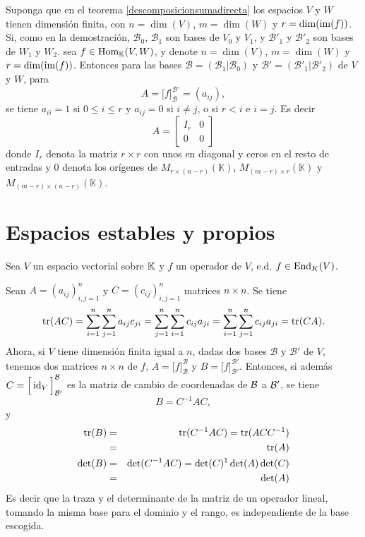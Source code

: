 \begin{obs}
Suponga que en el teorema \ref{descomposicionsumadirecta} los espacios $V$ y $W$ tienen dimensi\'on finita, con $n=\dim(V)$, $m=\dim(W)$ y $r=\dim(\operatorname{im}(f))$. Si, como en la demostración, $\mathcal{B}_0$, $\mathcal{B}_1$ son bases de $V_0$ y $V_1$, y $\mathcal{B}'_1$ y $\mathcal{B}'_2$ son bases de $W_1$ y $W_2$. sea $f\in\operatorname{Hom}_\mathbb{K}(V,W)$, y denote $n=\dim(V)$, $m=\dim(W)$ y $r=\dim(\operatorname{im}(f))$. Entonces para las bases $\mathcal{B}=\left(\mathcal{B}_1|\mathcal{B}_0\right)$ y $\mathcal{B}'=\left(\mathcal{B}'_1|\mathcal{B}'_2\right)$ de $V$ y $W$, para
\[
A=\Big[f\Big]^{\mathcal{B}'}_{\mathcal{B}}=(a_{ij}),
\]
se tiene $a_{ii}=1$ si $0\le i\le r$ y $a_{ij}=0$ si $i\ne j$, o si $r<i$ e $i=j$. Es decir
\[
A=\left[\begin{array}{c|c}
I_r & 0\\
\hline
0   & 0
\end{array}\right]
\]
donde $I_r$ denota la matriz $r\times r$ con unos en diagonal y ceros en el resto de entradas y $0$ denota los or\'igenes de $M_{r\times (n-r)}(\mathbb{K})$, $M_{(m-r)\times r}(\mathbb{K})$ y $M_{(m-r)\times(n-r)}(\mathbb{K})$.
\end{obs}

\section{Espacios estables y propios}

Sea $V$ un espacio vectorial sobre $\mathbb{K}$ y $f$ un operador de $V$, e.d. $f\in\operatorname{End}_K(V)$.

\begin{obs}
Sean $A=(a_{ij})_{i,j=1}^n$ y $C=(c_{ij})_{i,j=1}^n$ matrices $n\times n$. Se tiene
\[
  \operatorname{tr}(AC)=\sum_{i=1}^n\sum_{j=1}^na_{ij}c_{ji}=\sum_{j=1}^n\sum_{i=1}^nc_{ij}a_{ji}=\sum_{i=1}^n\sum_{j=1}^nc_{ij}a_{ji}=\operatorname{tr}(CA).
\]
Ahora, si $V$ tiene dimensi\'on finita igual a $n$, dadas dos bases $\mathcal{B}$ y $\mathcal{B}'$ de $V$, tenemos dos matrices $n\times n$ de $f$, $A=\Big[f\Big]^{\mathcal{B}}_{\mathcal{B}}$ y $B=\Big[f\Big]^{\mathcal{B}'}_{\mathcal{B}'}$. Entonces, si adem\'as $C=\Big[\operatorname{id}_V\Big]_{\mathcal{B}'}^{\mathcal{B}}$ es la matriz de cambio de coordenadas de $\mathcal{B}$ a $\mathcal{B}'$, se tiene
\[
  B=C^{-1}AC,
\]
y
\begin{eqnarray*}
  \operatorname{tr}(B) & = &\operatorname{tr}(C^{-1}AC)=\operatorname{tr}(ACC^{-1})\\
           & = &\operatorname{tr}(A)\\
  \det(B) & = & \det(C^{-1}AC)=\det(C)^{1}\det(A)\det(C)\\
             & = &\det(A)
\end{eqnarray*}
Es decir que la traza y el determinante de la matriz de un operador lineal, tomando la misma base para el dominio y el rango, es independiente de la base escogida.
\end{obs}


